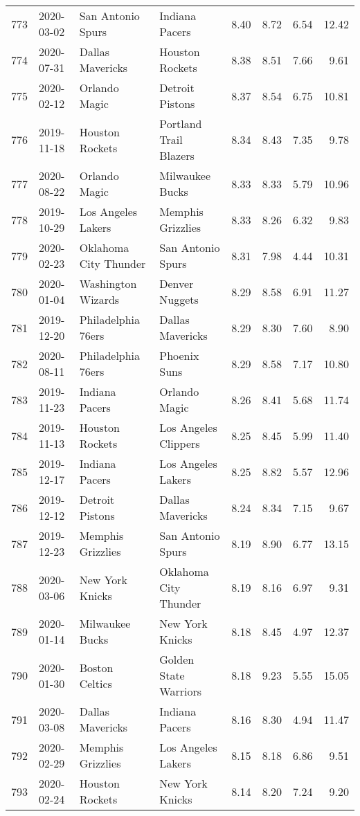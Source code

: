 \documentclass[
  11pt,
]{article}
\theoremstyle{nonumberplain}
\begin{document}
\begin{longtable}{rl|llr|rrr}
773 & 2020-03-02 & San Antonio Spurs & Indiana Pacers & 8.40 & 8.72 & 6.54 & 12.42\\
774 & 2020-07-31 & Dallas Mavericks & Houston Rockets & 8.38 & 8.51 & 7.66 & 9.61\\
775 & 2020-02-12 & Orlando Magic & Detroit Pistons & 8.37 & 8.54 & 6.75 & 10.81\\
776 & 2019-11-18 & Houston Rockets & Portland Trail Blazers & 8.34 & 8.43 & 7.35 & 9.78\\
777 & 2020-08-22 & Orlando Magic & Milwaukee Bucks & 8.33 & 8.33 & 5.79 & 10.96\\
778 & 2019-10-29 & Los Angeles Lakers & Memphis Grizzlies & 8.33 & 8.26 & 6.32 & 9.83\\
779 & 2020-02-23 & Oklahoma City Thunder & San Antonio Spurs & 8.31 & 7.98 & 4.44 & 10.31\\
780 & 2020-01-04 & Washington Wizards & Denver Nuggets & 8.29 & 8.58 & 6.91 & 11.27\\
781 & 2019-12-20 & Philadelphia 76ers & Dallas Mavericks & 8.29 & 8.30 & 7.60 & 8.90\\
782 & 2020-08-11 & Philadelphia 76ers & Phoenix Suns & 8.29 & 8.58 & 7.17 & 10.80\\
783 & 2019-11-23 & Indiana Pacers & Orlando Magic & 8.26 & 8.41 & 5.68 & 11.74\\
784 & 2019-11-13 & Houston Rockets & Los Angeles Clippers & 8.25 & 8.45 & 5.99 & 11.40\\
785 & 2019-12-17 & Indiana Pacers & Los Angeles Lakers & 8.25 & 8.82 & 5.57 & 12.96\\
786 & 2019-12-12 & Detroit Pistons & Dallas Mavericks & 8.24 & 8.34 & 7.15 & 9.67\\
787 & 2019-12-23 & Memphis Grizzlies & San Antonio Spurs & 8.19 & 8.90 & 6.77 & 13.15\\
788 & 2020-03-06 & New York Knicks & Oklahoma City Thunder & 8.19 & 8.16 & 6.97 & 9.31\\
789 & 2020-01-14 & Milwaukee Bucks & New York Knicks & 8.18 & 8.45 & 4.97 & 12.37\\
790 & 2020-01-30 & Boston Celtics & Golden State Warriors & 8.18 & 9.23 & 5.55 & 15.05\\
791 & 2020-03-08 & Dallas Mavericks & Indiana Pacers & 8.16 & 8.30 & 4.94 & 11.47\\
792 & 2020-02-29 & Memphis Grizzlies & Los Angeles Lakers & 8.15 & 8.18 & 6.86 & 9.51\\
793 & 2020-02-24 & Houston Rockets & New York Knicks & 8.14 & 8.20 & 7.24 & 9.20\\

\end{longtable}
\end{document}
